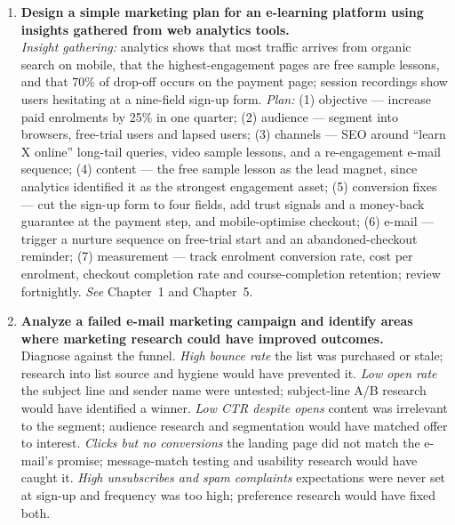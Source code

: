 \begin{enumerate}[leftmargin=2.2em,itemsep=1.4ex]
\item \textbf{Design a simple marketing plan for an e-learning platform using
      insights gathered from web analytics tools.}
      \\
      \emph{Insight gathering:} analytics shows that most traffic arrives from
      organic search on mobile, that the highest-engagement pages are free sample
      lessons, and that 70\% of drop-off occurs on the payment page; session
      recordings show users hesitating at a nine-field sign-up form.
      \emph{Plan:} (1) objective --- increase paid enrolments by 25\% in one
      quarter; (2) audience --- segment into browsers, free-trial users and
      lapsed users; (3) channels --- SEO around ``learn X online'' long-tail
      queries, video sample lessons, and a re-engagement e-mail sequence; (4)
      content --- the free sample lesson as the lead magnet, since analytics
      identified it as the strongest engagement asset; (5) conversion fixes ---
      cut the sign-up form to four fields, add trust signals and a money-back
      guarantee at the payment step, and mobile-optimise checkout; (6) e-mail ---
      trigger a nurture sequence on free-trial start and an abandoned-checkout
      reminder; (7) measurement --- track enrolment conversion rate, cost per
      enrolment, checkout completion rate and course-completion retention;
      review fortnightly. \hfill\emph{See} Chapter~1 and Chapter~5.

\item \textbf{Analyze a failed e-mail marketing campaign and identify areas where
      marketing research could have improved outcomes.}
      \\
      Diagnose against the funnel. \emph{High bounce rate} \ra{} the list was
      purchased or stale; research into list source and hygiene would have
      prevented it. \emph{Low open rate} \ra{} the subject line and sender name
      were untested; subject-line A/B research would have identified a winner.
      \emph{Low CTR despite opens} \ra{} content was irrelevant to the segment;
      audience research and segmentation would have matched offer to interest.
      \emph{Clicks but no conversions} \ra{} the landing page did not match the
      e-mail's promise; message-match testing and usability research would have
      caught it. \emph{High unsubscribes and spam complaints} \ra{} expectations
      were never set at sign-up and frequency was too high; preference research
      would have fixed both.


\end{enumerate}
